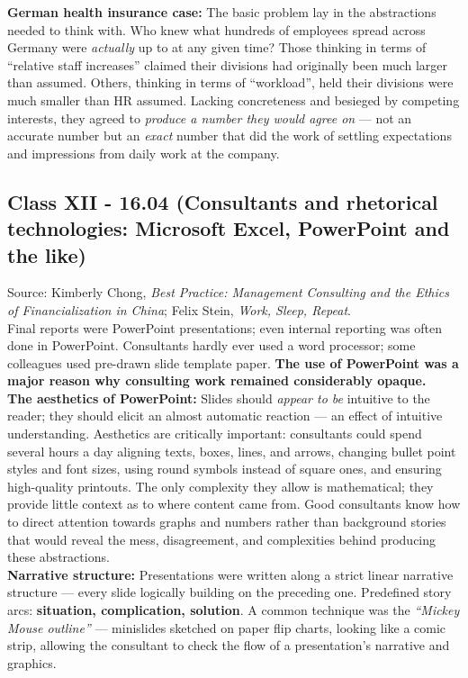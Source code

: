 \documentclass[a4paper,12pt]{article}
\begin{document}
\noindent \textbf{German health insurance case:} The basic problem lay in the abstractions needed to think with. Who knew what hundreds of employees spread across Germany were \emph{actually} up to at any given time? Those thinking in terms of ``relative staff increases'' claimed their divisions had originally been much larger than assumed. Others, thinking in terms of ``workload'', held their divisions were much smaller than HR assumed. Lacking concreteness and besieged by competing interests, they agreed to \emph{produce a number they would agree on} — not an accurate number but an \emph{exact} number that did the work of settling expectations and impressions from daily work at the company.

\subsection*{Class XII - 16.04 (Consultants and rhetorical technologies: Microsoft Excel, PowerPoint and the like)}
\noindent Source: Kimberly Chong, \emph{Best Practice: Management Consulting and the Ethics of Financialization in China}; Felix Stein, \emph{Work, Sleep, Repeat}. \\

\noindent Final reports were PowerPoint presentations; even internal reporting was often done in PowerPoint. Consultants hardly ever used a word processor; some colleagues used pre-drawn slide template paper. \textbf{The use of PowerPoint was a major reason why consulting work remained considerably opaque.} \\

\noindent \textbf{The aesthetics of PowerPoint:} Slides should \emph{appear to be} intuitive to the reader; they should elicit an almost automatic reaction — an effect of intuitive understanding. Aesthetics are critically important: consultants could spend several hours a day aligning texts, boxes, lines, and arrows, changing bullet point styles and font sizes, using round symbols instead of square ones, and ensuring high-quality printouts. The only complexity they allow is mathematical; they provide little context as to where content came from. Good consultants know how to direct attention towards graphs and numbers rather than background stories that would reveal the mess, disagreement, and complexities behind producing these abstractions. \\

\noindent \textbf{Narrative structure:} Presentations were written along a strict linear narrative structure — every slide logically building on the preceding one. Predefined story arcs: \textbf{situation, complication, solution}. A common technique was the \emph{``Mickey Mouse outline''} — minislides sketched on paper flip charts, looking like a comic strip, allowing the consultant to check the flow of a presentation's narrative and graphics. \\
\end{document}
